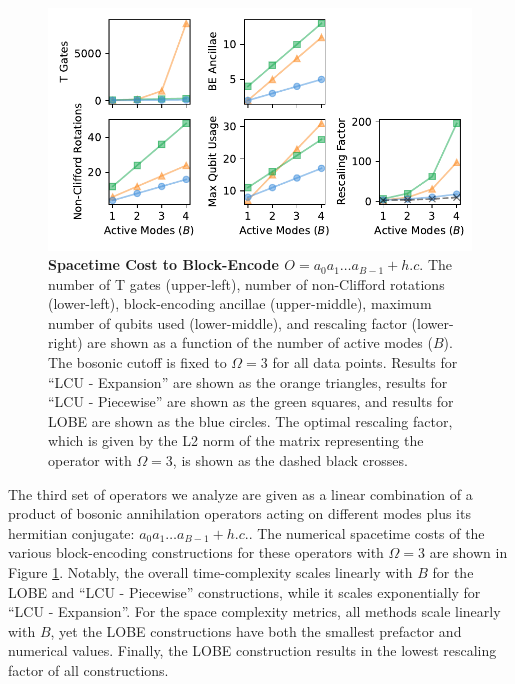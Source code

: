 \begin{figure}
    \centering
    \includegraphics[width=14cm]{figures/bosonic-hc-comparison.pdf}
    \caption{
        \textbf{Spacetime Cost to Block-Encode $O = a_0 a_1 \hdots a_{B-1} + h.c.$}
        The number of T gates (upper-left), number of non-Clifford rotations (lower-left), block-encoding ancillae (upper-middle), maximum number of qubits used (lower-middle), and rescaling factor (lower-right) are shown as a function of the number of active modes ($B$).
        The bosonic cutoff is fixed to $\Omega = 3$ for all data points.
        Results for ``LCU - Expansion'' are shown as the orange triangles, results for ``LCU - Piecewise'' are shown as the green squares, and results for LOBE are shown as the blue circles.
        The optimal rescaling factor, which is given by the L2 norm of the matrix representing the operator with $\Omega = 3$, is shown as the dashed black crosses.
    }
    \label{fig:bosonic-hc-comparison}
\end{figure}

The third set of operators we analyze are given as a linear combination of a product of bosonic annihilation operators acting on different modes plus its hermitian conjugate: $a_0 a_1 \hdots a_{B-1} + h.c.$.
The numerical spacetime costs of the various block-encoding constructions for these operators with $\Omega = 3$ are shown in Figure \ref{fig:bosonic-hc-comparison}.
Notably, the overall time-complexity scales linearly with $B$ for the LOBE and ``LCU - Piecewise'' constructions, while it scales exponentially for ``LCU - Expansion''.
For the space complexity metrics, all methods scale linearly with $B$, yet the LOBE constructions have both the smallest prefactor and numerical values.
Finally, the LOBE construction results in the lowest rescaling factor of all constructions.



